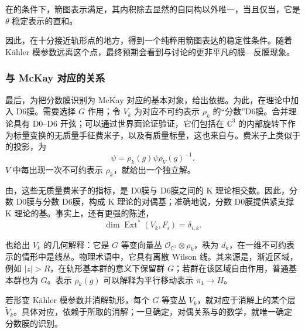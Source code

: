 在的条件下，箭图表示满足，其内积除去显然的自同构以外唯一，当且仅当，它是 $\theta$ 稳定表示的直和。

因此，在十分接近轨形点的地方，得到一个纯粹用箭图表达的稳定性条件。随着 K\"ahler 模参数远离这个点，最终预期会看到与讨论的更非平凡的膜—反膜现象。

\subsubsection{与 McKay 对应的关系}\label{sec:5.4.5.6}

最后，为把分数膜识别为 McKay 对应的基本对象，给出依据。为此，在理论中加入 D6膜。需要选择 $G$ 作用；令 $V_k$ 为对应不可约表示 $\rho_k$ 的“分数”D6膜。合并理论具有 D0--D6 开弦；可以通过世界面论证验证，它们包括在 $\mathbb{C}^3$ 的内部旋转下作为标量变换的无质量手征费米子，以及有质量标量，这也来自与。费米子上类似于的投影，为
\begin{equation}\label{eq:5.121}
\psi=\rho_k(g)\psi\rho_V(g)^{-1}.
\end{equation}
$V$ 中每出现一次不可约表示 $\rho_k$，就给出一个独立解。

由，这些无质量费米子的指标，是 D0膜与 D6膜之间的 K 理论相交数。因此，分数 D0膜与分数 D6膜，构成 K 理论的对偶基；准确地说，分数 D0膜提供紧支撑 K 理论的基。事实上，还有更强的陈述，
\begin{equation}\label{eq:5.122}
\dim\operatorname{Ext}^*(V_k,F_i)=\delta_{i,k}.
\end{equation}

也给出 $V_k$ 的几何解释：它是 $G$ 等变向量丛 $\mathcal{O}_{\mathbb{C}^3}\otimes\rho_k$，秩为 $d_k$，在一维不可约表示的情形中是线丛。物理术语中，它具有离散 Wilson 线。其来源是，渐近区域，例如 $|z|>R$，在轨形基本群的意义下保留群 $G$；若群在该区域自由作用，普通基本群也为 $G$。表示 $\rho_k(g)$ 可以解释为平行移动表示 $\pi_1\to H$。

若形变 K\"ahler 模参数并消解轨形，每个 $G$ 等变丛 $V_k$，就对应于消解上的某个层 $\widetilde V_k$。具体对应，依赖于所取的消解；一旦确定，对偶关系与的数学，就唯一确定分数膜的识别。

